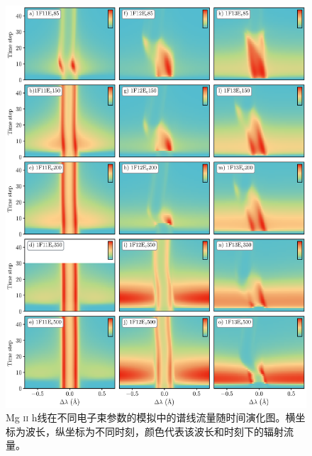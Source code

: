 \begin{figure}
	\centering
	\includegraphics[width=\textwidth]{figs/dMe_MgIIh}
	\caption{Mg \textsc{ii} h线在不同电子束参数的模拟中的谱线流量随时间演化图。横坐标为波长，纵坐标为不同时刻，颜色代表该波长和时刻下的辐射流量。}
	\label{fig:4.4}
\end{figure}


